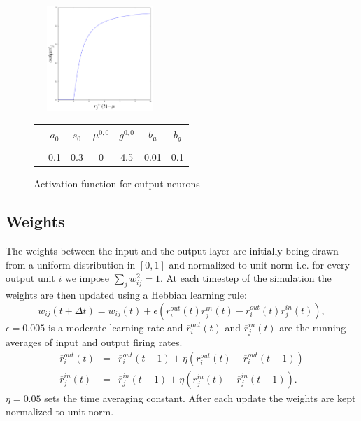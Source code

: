 \documentclass[a4paper, 12pt]{article}
\begin{document}
\begin{figure}[h]
\setlength{\abovecaptionskip}{5pt}
\setlength{\belowcaptionskip}{0pt}	
	\begin{minipage}[t]{0.5\textwidth}\vspace{0pt}
	\includegraphics[width=5cm, height=4cm]{pics/output_function.png}
	\caption{\footnotesize{Activation function for output neurons}}
	\end{minipage}
\hfill
	\begin{minipage}[t]{0.5\textwidth}\vspace{20pt}
	\begin{tabular}{c|cccccc}
	& $a_0$ & $s_0$ & $\mu^{0,0}$ & $g^{0,0}$ & $b_\mu$ & $b_g$\\
	\hline\\
	& 0.1 & 0.3 & 0 & 4.5 & 0.01 & 0.1\\
	\end{tabular}
	\end{minipage}
\end{figure}	
%
%
%
\subsection{Weights}
The weights between the input and the output layer are initially being drawn from a uniform distribution in $[0,1]$ and normalized to unit norm i.e. for every output unit $i$ we impose $\sum_jw^2_{ij}=1$. At each timestep of the simulation the weights are then updated using a Hebbian learning rule:  
\begin{equation}
w_{ij}(t+\Delta t)= w_{ij}(t)+ \epsilon(r_i^{out}(t)r_j^{in}(t)-\overline{r}_i^{out}(t)\overline{r}_j^{in}(t)),
\end{equation}
$\epsilon= 0.005$ is a moderate learning rate and $\overline{r}_i^{out}(t)$ and $\overline{r}_j^{in}(t)$ are the running averages of input and output firing rates.  
	\begin{eqnarray}
	\overline{r}_i^{out}(t) &=& \overline{r}_i^{out}(t-1)+ \eta(r_i^{out}(t)-\overline{r}_i^{out}(t-1))\\
	\overline{r}_j^{in}(t) &=& \overline{r}_j^{in}(t-1)+ \eta(r_j^{in}(t)-\overline{r}_j^{in}(t-1)).
	\end{eqnarray}
$\eta=0.05$ sets the time averaging constant. After each update the weights are kept normalized to unit norm. 
%
%
\end{document}
